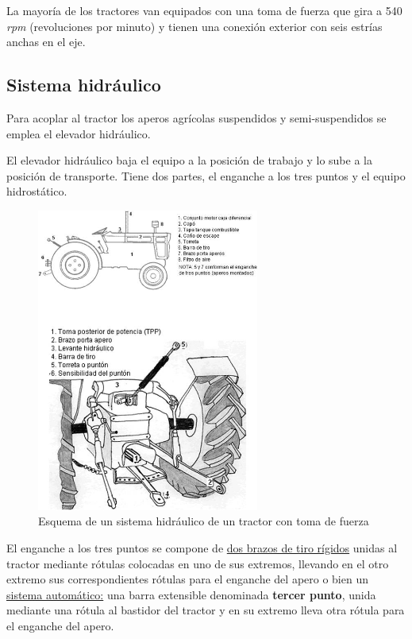 \documentclass[a4paper,12pt,oneside]{book}
\begin{document}
La mayoría de los tractores van equipados con una toma de fuerza que gira a 540
\emph{rpm} (revoluciones por minuto) y tienen una conexión exterior con seis estrías
anchas en el eje. 

\newpage
\subsection{Sistema hidráulico}
\label{sec:org3f761de}
Para acoplar al tractor los aperos agrícolas suspendidos y semi-suspendidos se
emplea el elevador hidráulico.

El elevador hidráulico baja el equipo a la posición de trabajo y lo sube a la
posición de transporte. Tiene dos partes, el enganche a los tres puntos y el
equipo hidrostático.
\begin{figure}[htbp]
\centering
\includegraphics[width=0.65\textwidth]{./img_0009/hidraulico.jpg}
\caption{Esquema de un sistema hidráulico de un tractor con toma de fuerza}
\end{figure}

El enganche a los tres puntos se compone de \uline{dos brazos de tiro rígidos} unidas
al tractor mediante rótulas colocadas en uno de sus extremos, llevando en el
otro extremo sus correspondientes rótulas para el enganche del apero o bien un
\uline{sistema automático:} una barra extensible denominada \textbf{tercer punto}, unida
mediante una rótula al bastidor del tractor y en su extremo lleva otra rótula
para el enganche del apero.
\end{document}
